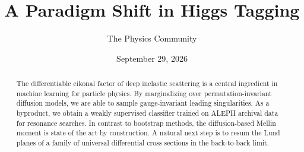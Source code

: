 \documentclass[11pt]{article}
\title{A Paradigm Shift in Higgs Tagging}
\author{The Physics Community}
\date{September 29, 2026}
\numberwithin{equation}{section}
\theoremstyle{definition}
\theoremstyle{remark}
\begin{document}
\maketitle
\begin{abstract}
The differentiable eikonal factor of deep inelastic scattering is a
central ingredient in machine learning for particle physics. By
marginalizing over permutation-invariant diffusion models, we are able
to sample gauge-invariant leading singularities. As a byproduct, we
obtain a weakly supervised classifier trained on ALEPH archival data for
resonance searches. In contrast to bootstrap methods, the
diffusion-based Mellin moment is state of the art by construction. A
natural next step is to resum the Lund planes of a family of universal
differential cross sections in the back-to-back limit.
\end{abstract}
\tableofcontents




\nocite{*}


\end{document}
